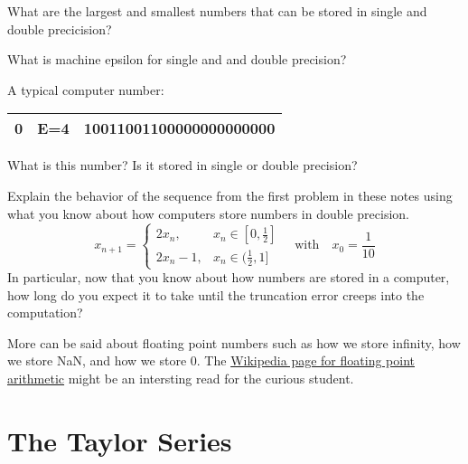 \begin{problem}
    What are the largest and smallest numbers that can be stored in single and double
    precicision?
\end{problem}

\begin{problem}
    What is machine epsilon for single and and double precision?
\end{problem}



\begin{problem}
A typical computer number:
    \begin{center}
        \begin{tabular}{|c|c|c|}
            \hline
            0 & E=4 & 10011001100000000000000 \\ \hline
        \end{tabular}
    \end{center}
    What is this number?  Is it stored in single or double precision? 
\end{problem}


\begin{problem}
    Explain the behavior of the sequence from the first problem in these notes using what
    you know about how computers store numbers in double precision.
    \[ x_{n+1} = \left\{ \begin{array}{ll} 2x_n, & x_n \in [0,\frac{1}{2}] \\ 2x_n - 1, & x_n \in
        (\frac{1}{2},1] \end{array} \right. \quad \text{with} \quad x_0 = \frac{1}{10} \]
    In particular, now that you know about how numbers are stored in a computer, how long
    do you expect it to take until the truncation error creeps into the computation?
\end{problem}

More can be said about floating point numbers such as how we store infinity, how we store
NaN, and how we store 0.  The
\href{https://en.wikipedia.org/wiki/Floating-point_arithmetic}{Wikipedia page for floating
point arithmetic} might be an intersting read for the curious student.




\section{The Taylor Series}

